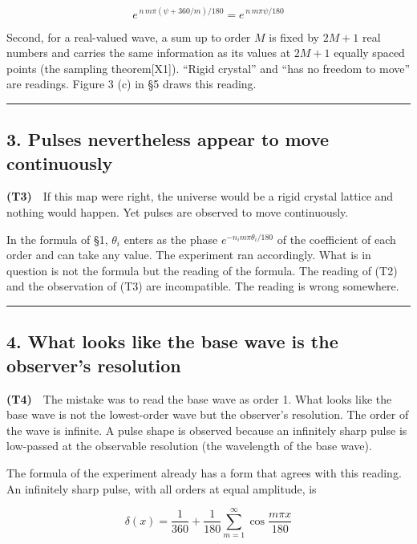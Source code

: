 \documentclass[
  a4paper,
]{article}
\begin{document}
\[
e^{\,n\,m\pi(\psi+360/m)/180}=e^{\,n\,m\pi\psi/180}
\]

Second, for a real-valued wave, a sum up to order \(M\) is fixed by
\(2M+1\) real numbers and carries the same information as its values at
\(2M+1\) equally spaced points (the sampling theorem{[}X1{]}). ``Rigid
crystal'' and ``has no freedom to move'' are readings. Figure 3 (c) in
§5 draws this reading.

\begin{center}\rule{0.5\linewidth}{0.5pt}\end{center}

\subsection{3. Pulses nevertheless appear to move
continuously}\label{pulses-nevertheless-appear-to-move-continuously}

\textbf{(T3)}　If this map were right, the universe would be a rigid
crystal lattice and nothing would happen. Yet pulses are observed to
move continuously.

In the formula of §1, \(\theta_i\) enters as the phase
\(e^{-n_i m\pi\theta_i/180}\) of the coefficient of each order and can
take any value. The experiment ran accordingly. What is in question is
not the formula but the reading of the formula. The reading of (T2) and
the observation of (T3) are incompatible. The reading is wrong
somewhere.

\begin{center}\rule{0.5\linewidth}{0.5pt}\end{center}

\subsection{4. What looks like the base wave is the observer's
resolution}\label{what-looks-like-the-base-wave-is-the-observers-resolution}

\textbf{(T4)}　The mistake was to read the base wave as order 1. What
looks like the base wave is not the lowest-order wave but the observer's
resolution. The order of the wave is infinite. A pulse shape is observed
because an infinitely sharp pulse is low-passed at the observable
resolution (the wavelength of the base wave).

The formula of the experiment already has a form that agrees with this
reading. An infinitely sharp pulse, with all orders at equal amplitude,
is

\[
\delta(x)=\frac{1}{360}+\frac{1}{180}\sum_{m=1}^{\infty}\cos\frac{m\pi x}{180}
\]
\end{document}
